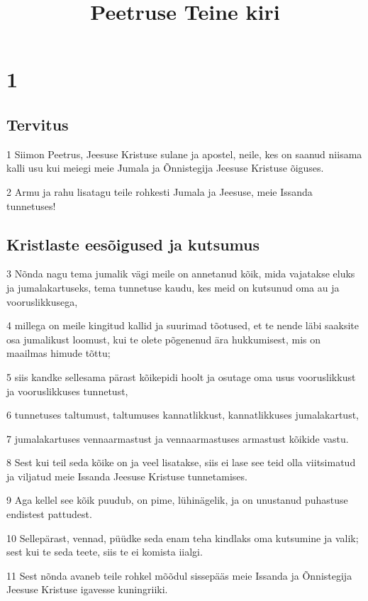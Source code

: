 

\title{Peetruse Teine kiri}

\chapter{1}

\section*{Tervitus}

\par 1 Siimon Peetrus, Jeesuse Kristuse sulane ja apostel, neile, kes on saanud niisama kalli usu kui meiegi meie Jumala ja Õnnistegija Jeesuse Kristuse õiguses.
\par 2 Armu ja rahu lisatagu teile rohkesti Jumala ja Jeesuse, meie Issanda tunnetuses!

\section*{Kristlaste eesõigused ja kutsumus}

\par 3 Nõnda nagu tema jumalik vägi meile on annetanud kõik, mida vajatakse eluks ja jumalakartuseks, tema tunnetuse kaudu, kes meid on kutsunud oma au ja vooruslikkusega,
\par 4 millega on meile kingitud kallid ja suurimad tõotused, et te nende läbi saaksite osa jumalikust loomust, kui te olete põgenenud ära hukkumisest, mis on maailmas himude tõttu;
\par 5 siis kandke sellesama pärast kõikepidi hoolt ja osutage oma usus vooruslikkust ja vooruslikkuses tunnetust,
\par 6 tunnetuses taltumust, taltumuses kannatlikkust, kannatlikkuses jumalakartust,
\par 7 jumalakartuses vennaarmastust ja vennaarmastuses armastust kõikide vastu.
\par 8 Sest kui teil seda kõike on ja veel lisatakse, siis ei lase see teid olla viitsimatud ja viljatud meie Issanda Jeesuse Kristuse tunnetamises.
\par 9 Aga kellel see kõik puudub, on pime, lühinägelik, ja on unustanud puhastuse endistest pattudest.
\par 10 Sellepärast, vennad, püüdke seda enam teha kindlaks oma kutsumine ja valik; sest kui te seda teete, siis te ei komista iialgi.
\par 11 Sest nõnda avaneb teile rohkel mõõdul sissepääs meie Issanda ja Õnnistegija Jeesuse Kristuse igavesse kuningriiki.

